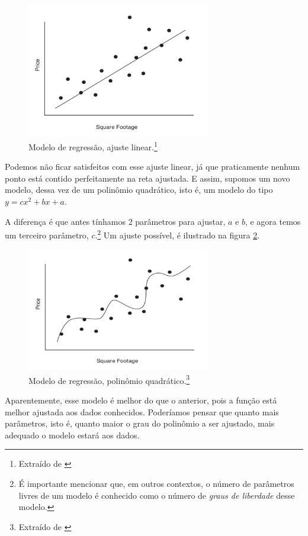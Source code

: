 \begin{figure}[htb]
\centering
\includegraphics[width=8cm]{figuras/over_reg_1}
\caption{Modelo de regressão, ajuste linear.\footnote{Extraído de \citep{allen}}}
\label{fig:over_reg_1}
\end{figure}

Podemos não ficar satisfeitos com esse ajuste linear, já que praticamente nenhum ponto está contido perfeitamente na reta ajustada. E assim, supomos um novo modelo, dessa vez de um polinômio quadrático, isto é, um modelo do tipo $y = cx^2 + bx + a$. 

A diferença é que antes tínhamos $2$ parâmetros para ajustar, $a$ e $b$, e agora temos um terceiro parâmetro, $c$.\footnote{É importante mencionar que, em outros contextos, o número de parâmetros livres de um modelo é conhecido como o número de \emph{graus de liberdade} desse modelo.} Um ajuste possível, é ilustrado na figura \ref{fig:over_reg_2}.

\begin{figure}[htb]
\centering
\includegraphics[width=8cm]{figuras/over_reg_2}
\caption{Modelo de regressão, polinômio quadrático.\footnote{Extraído de \citep{allen}}}
\label{fig:over_reg_2}
\end{figure}

Aparentemente, esse modelo é melhor do que o anterior, pois a função está melhor ajustada aos dados conhecidos. Poderíamos pensar que quanto mais parâmetros, isto é, quanto maior o grau do polinômio a ser ajustado, mais adequado o modelo estará aos dados. 

